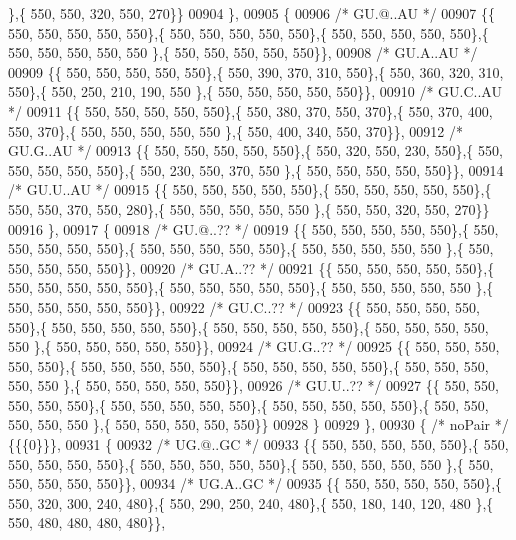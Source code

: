 \begin{DoxyCode}
      \},\{ 550, 550, 320, 550, 270\}\}
00904 \},
00905 \{
00906 \textcolor{comment}{/* GU.@..AU */}
00907 \{\{ 550, 550, 550, 550, 550\},\{ 550, 550, 550, 550, 550\},\{ 550, 550, 550, 550, 550\},\{ 550, 550, 550, 550, 550
      \},\{ 550, 550, 550, 550, 550\}\},
00908 \textcolor{comment}{/* GU.A..AU */}
00909 \{\{ 550, 550, 550, 550, 550\},\{ 550, 390, 370, 310, 550\},\{ 550, 360, 320, 310, 550\},\{ 550, 250, 210, 190, 550
      \},\{ 550, 550, 550, 550, 550\}\},
00910 \textcolor{comment}{/* GU.C..AU */}
00911 \{\{ 550, 550, 550, 550, 550\},\{ 550, 380, 370, 550, 370\},\{ 550, 370, 400, 550, 370\},\{ 550, 550, 550, 550, 550
      \},\{ 550, 400, 340, 550, 370\}\},
00912 \textcolor{comment}{/* GU.G..AU */}
00913 \{\{ 550, 550, 550, 550, 550\},\{ 550, 320, 550, 230, 550\},\{ 550, 550, 550, 550, 550\},\{ 550, 230, 550, 370, 550
      \},\{ 550, 550, 550, 550, 550\}\},
00914 \textcolor{comment}{/* GU.U..AU */}
00915 \{\{ 550, 550, 550, 550, 550\},\{ 550, 550, 550, 550, 550\},\{ 550, 550, 370, 550, 280\},\{ 550, 550, 550, 550, 550
      \},\{ 550, 550, 320, 550, 270\}\}
00916 \},
00917 \{
00918 \textcolor{comment}{/* GU.@..?? */}
00919 \{\{ 550, 550, 550, 550, 550\},\{ 550, 550, 550, 550, 550\},\{ 550, 550, 550, 550, 550\},\{ 550, 550, 550, 550, 550
      \},\{ 550, 550, 550, 550, 550\}\},
00920 \textcolor{comment}{/* GU.A..?? */}
00921 \{\{ 550, 550, 550, 550, 550\},\{ 550, 550, 550, 550, 550\},\{ 550, 550, 550, 550, 550\},\{ 550, 550, 550, 550, 550
      \},\{ 550, 550, 550, 550, 550\}\},
00922 \textcolor{comment}{/* GU.C..?? */}
00923 \{\{ 550, 550, 550, 550, 550\},\{ 550, 550, 550, 550, 550\},\{ 550, 550, 550, 550, 550\},\{ 550, 550, 550, 550, 550
      \},\{ 550, 550, 550, 550, 550\}\},
00924 \textcolor{comment}{/* GU.G..?? */}
00925 \{\{ 550, 550, 550, 550, 550\},\{ 550, 550, 550, 550, 550\},\{ 550, 550, 550, 550, 550\},\{ 550, 550, 550, 550, 550
      \},\{ 550, 550, 550, 550, 550\}\},
00926 \textcolor{comment}{/* GU.U..?? */}
00927 \{\{ 550, 550, 550, 550, 550\},\{ 550, 550, 550, 550, 550\},\{ 550, 550, 550, 550, 550\},\{ 550, 550, 550, 550, 550
      \},\{ 550, 550, 550, 550, 550\}\}
00928 \}
00929 \},
00930 \{ \textcolor{comment}{/* noPair */} \{\{\{0\}\}\},
00931 \{
00932 \textcolor{comment}{/* UG.@..GC */}
00933 \{\{ 550, 550, 550, 550, 550\},\{ 550, 550, 550, 550, 550\},\{ 550, 550, 550, 550, 550\},\{ 550, 550, 550, 550, 550
      \},\{ 550, 550, 550, 550, 550\}\},
00934 \textcolor{comment}{/* UG.A..GC */}
00935 \{\{ 550, 550, 550, 550, 550\},\{ 550, 320, 300, 240, 480\},\{ 550, 290, 250, 240, 480\},\{ 550, 180, 140, 120, 480
      \},\{ 550, 480, 480, 480, 480\}\},

\end{DoxyCode}
